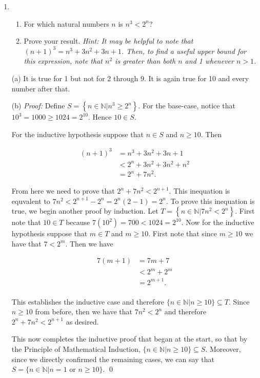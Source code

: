 \documentclass[12pt]{article}
\begin{document}
{\begin{enumerate}
(Note: By a direct and tedious calculation we could confirm that indeed $1,2,3\not\in S$.)

\item 	\begin{enumerate}
		\item For which natural numbers $n$ is $n^3 < 2^n$?
		\item Prove your result. \emph{Hint: It may be helpful to note that \\$(n+1)^3 = n^3 + 3n^2 + 3n + 1$. Then, to find a useful upper bound for this expression, note that $n^2$ is greater than both $n$ and 1 whenever $n > 1$.}
		\end{enumerate}

(a) It is true for 1 but not for 2 through 9.  It is again true for 10 and every number after that.

(b) {\it Proof:} Define $S=\left\{n\in\mathbb{N}|n^3\geq 2^n\right\}$.  For the base-case, notice that $10^3 = 1000\geq 1024 = 2^{10}$.  Hence $10\in S$.

For the inductive hypothesis suppose that $n\in S$ and $n\geq 10$.  Then

\begin{align*}
  (n+1)^3 &= n^3 + 3n^2+3n+1\\[.3cm]
  &< 2^n + 3n^2 + 3n^2 + n^2 \\[.3cm]
  &= 2^n + 7n^2.
\end{align*}

From here we need to prove that $2^n + 7n^2 < 2^{n+1}$.  This inequation is equvalent to $7n^2<2^{n+1}-2^n = 2^n(2-1)=2^n$.  To prove this inequation is true, we begin another proof by induction.  Let $T = \left\{n\in\mathbb{N}|7n^2<2^n\right\}$.  First note that $10\in T$ because $7(10^2)=700<1024=2^{10}$.  Now for the inductive hypothesis suppose that $m\in T$ and $m\geq 10$.  First note that since $m\geq 10$ we have that $7 < 2^m$.  Then we have

\begin{align*}
  7(m+1) &= 7m + 7 \\[.3cm]
  &< 2^m + 2^m \\[.3cm]
  &= 2^{m+1}.\\
\end{align*}

This establishes the inductive case and therefore $\{n\in\mathbb{N}|n\geq 10\}\subseteq T$.  Since $n\geq 10$ from before, then we have that $7n^2 < 2^{n}$ and therefore $2^n+7n^2 < 2^{n+1}$ as desired.

This now completes the inductive proof that began at the start, so that by the Principle of Mathematical Induction, $\{n\in\mathbb{N}|n\geq 10\}\subseteq S$.  Moreover, since we directly confirmed the remaining cases, we can say that $S = \{n\in\mathbb{N}|n=1 \text{ or } n\geq 10\}$. \qed


\end{enumerate}}
\end{document}

